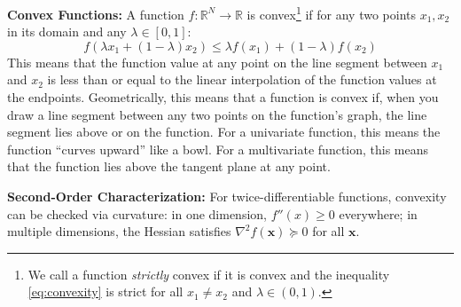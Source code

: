\textbf{Convex Functions:}
A function $f: \mathbb{R}^N \to \mathbb{R}$ is convex\footnote{We call a function \emph{strictly} convex if it is convex and the inequality \autoref{eq:convexity} is strict for all $x_1 \neq x_2$ and $\lambda \in (0,1)$.} if for any two points $x_1, x_2$ in its domain and any $\lambda \in [0,1]$:
\begin{equation}
    f(\lambda x_1 + (1-\lambda) x_2) \leq \lambda f(x_1) + (1-\lambda) f(x_2)
    \label{eq:convexity}
\end{equation}
This means that the function value at any point on the line segment between $x_1$ and $x_2$ is less than or equal to the linear interpolation of the function values at the endpoints. Geometrically, this means that a function is convex if, when you draw a line segment between any two points on the function's graph, the line segment lies above or on the function. For a univariate function, this means the function ``curves upward'' like a bowl. For a multivariate function, this means that the function lies above the tangent plane at any point.


\textbf{Second-Order Characterization:}
For twice-differentiable functions, convexity can be checked via curvature: in one dimension, $f''(x)\ge 0$ everywhere; in multiple dimensions, the Hessian satisfies $\nabla^2 f(\mathbf{x}) \succeq 0$ for all $\mathbf{x}$.

